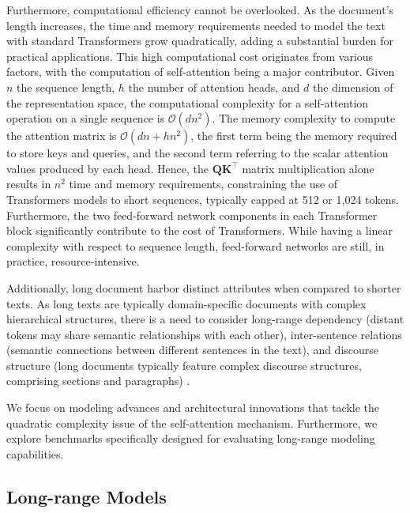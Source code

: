 Furthermore, computational efficiency cannot be overlooked. As the document's length increases, the time and memory requirements needed to model the text with standard Transformers grow quadratically, adding a substantial burden for practical applications. This high computational cost originates from various factors, with the computation of self-attention being a major contributor. Given $n$ the sequence length, $h$ the number of attention heads, and $d$ the dimension of the representation space, the computational complexity for a self-attention operation on a single sequence is $\mathcal{O}(dn^2)$. The memory complexity to compute the attention matrix is $\mathcal{O}(dn + hn^2)$, the first term being the memory required to store keys and queries, and the second term referring to the scalar attention values produced by each head. Hence, the $\bm{Q}\bm{K}^{\top}$ matrix multiplication alone results in $n^2$ time and memory requirements, constraining the use of Transformers models to short sequences, typically capped at 512 or 1,024 tokens. Furthermore, the two feed-forward network components in each Transformer block significantly contribute to the cost of Transformers. While having a linear complexity with respect to sequence length, feed-forward networks are still, in practice, resource-intensive.

Additionally, long document harbor distinct attributes when compared to shorter texts. As long texts are typically domain-specific documents with complex hierarchical structures, there is a need to consider long-range dependency (distant tokens may share semantic relationships with each other), inter-sentence relations (semantic connections between different sentences in the text), and discourse structure (long documents typically feature complex discourse structures, comprising sections and paragraphs) \citep{dong2023survey}.

We focus on modeling advances and architectural innovations that tackle the quadratic complexity issue of the self-attention mechanism. Furthermore, we explore benchmarks specifically designed for evaluating long-range modeling capabilities.

\subsection{Long-range Models}

